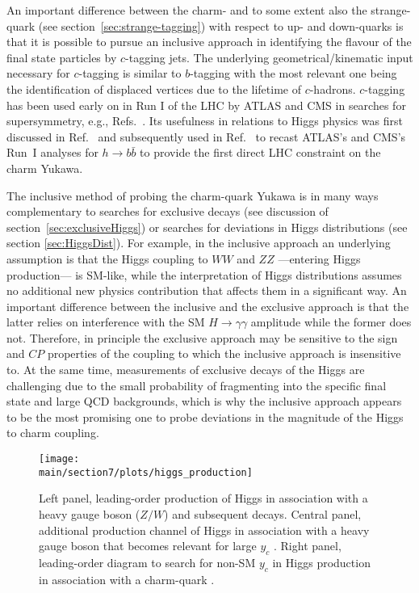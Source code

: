 \documentclass[../report.tex]{subfiles}
\providecommand{\main}{..}
\begin{document}
An important difference between the charm- and to some extent also the strange-quark (see section~\ref{sec:strange-tagging}) with respect to up- and 
down-quarks is that it is possible to pursue an inclusive approach in
identifying the flavour of the final state particles by $c$-tagging jets.
The underlying geometrical/kinematic input necessary for $c$-tagging
is similar to $b$-tagging with the most relevant one being the identification
of displaced vertices due to the lifetime of $c$-hadrons.
$c$-tagging has been used early on in Run I of the LHC by ATLAS and CMS in searches for supersymmetry, e.g., Refs.~\cite{Aad:2014nra,Aad:2015gna}.
Its usefulness in relations to Higgs physics was first discussed in Ref.~\cite{Delaunay:2013pja} and subsequently
used in Ref.~\cite{Perez:2015aoa} to recast ATLAS's and CMS's Run~I analyses for $h\to b\bar b$ to provide the first direct LHC 
constraint on the charm Yukawa. 

The inclusive method of probing the charm-quark Yukawa is in many ways complementary 
to searches for exclusive decays (see discussion of section~\ref{sec:exclusiveHiggs}) or 
searches for deviations in Higgs distributions (see section \ref{sec:HiggsDist}).
For example, in the inclusive approach an underlying assumption is 
that the Higgs coupling to $WW$ and $ZZ$ ---entering Higgs production--- is SM-like,
while the interpretation of Higgs distributions assumes no additional new physics contribution that affects them in a significant way.
An important difference between the inclusive and the exclusive approach is that the latter relies on interference with the SM $H\to \gamma\gamma$ amplitude while the former does not.
Therefore, in principle the exclusive approach may be sensitive to the sign and 
$CP$ properties of the coupling to which the inclusive approach is insensitive to.
At the same time, measurements of exclusive decays of the Higgs are challenging due 
to the small probability of fragmenting into the specific final state and 
large QCD backgrounds, which is why the inclusive approach appears to be the most promising one to probe deviations in the magnitude of the Higgs to charm coupling.

\begin{figure}[t]
	\centering
	\texttt{[image: \\main/section7/plots/higgs\_production]}
	\caption{Left panel, leading-order production of Higgs in association with a heavy gauge boson ($Z/W$) and 
		subsequent decays. Central panel, additional production channel of Higgs in association 
		with a heavy gauge boson that becomes relevant for large $y_c$ \cite{Perez:2015aoa}.
		Right panel, leading-order diagram to search for non-SM $y_c$ in Higgs production in 
		association with a charm-quark \cite{Brivio:2015fxa}.
	\label{fig:higgsproductionHcc}
	}
\end{figure}
\end{document}
